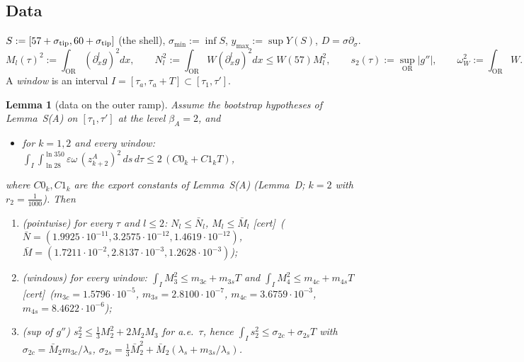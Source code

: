 \documentclass[11pt]{article}
\newtheorem{lemma}{Lemma}\newtheorem{proposition}{Proposition}\newtheorem{remark}{Remark}\newtheorem{definition}{Definition}
\newcommand{\tC}{\textup{[cert]}}\newcommand{\tHd}{\textup{[hand]}}\newcommand{\tE}{\textup{[est]}}\newcommand{\tS}{\textup{[sym]}}
\newcommand{\OR}{\mathrm{OR}}\newcommand{\eI}{\varepsilon_I}
\begin{document}
\subsection{Data}\label{F:sec:data}
$S:=[57+\sigma_{\rm tip},60+\sigma_{\rm tip}]$ (the shell), $\sigma_{\min}:=\inf S$, $y_{\max}:=\sup Y(S)$, $D=\sigma\partial_\sigma$.
\[M_l(\tau)^2:=\int_{\OR}(\partial_x^lg)^2dx,\qquad N_l^2:=\int_{\OR}W(\partial_x^lg)^2dx\le W(57)M_l^2,\qquad s_2(\tau):=\sup_{\OR}|g''|,\qquad\omega_W^2:=\int_{\OR}W .\]
A \emph{window} is an interval $I=[\tau_a,\tau_a+T]\subset[\tau_1,\tau']$.

\begin{lemma}[data on the outer ramp]\label{F:lem:data}
Assume the bootstrap hypotheses of Lemma~S(A) on $[\tau_1,\tau']$ at the level $\beta_A=2$, and
\begin{itemize}[leftmargin=3.2em]
\item[\textup{(B$\Phi$)}] for $k=1,2$ and every window: $\displaystyle\int_I\!\int_{\ln28}^{\ln350}\varepsilon\omega\,(z^A_{k+2})^2\,ds\,d\tau\le2\,(C0_k+C1_kT)$,
\end{itemize}
where $C0_k,C1_k$ are the export constants of Lemma~S(A) (Lemma~D; $k=2$ with $r_2=\frac1{1000}$). Then
\begin{enumerate}[label=(\alph*)]
\item \emph{(pointwise)} for every $\tau$ and $l\le2$: $N_l\le\bar N_l$, $M_l\le\bar M_l$ \tC\ ($\bar N=(1.9925\cdot10^{-11}, 3.2575\cdot10^{-12}, 1.4619\cdot10^{-12})$, $\bar M=(1.7211\cdot10^{-2}, 2.8137\cdot10^{-3}, 1.2628\cdot10^{-3})$);
\item \emph{(windows)} for every window: $\int_IM_3^2\le m_{3c}+m_{3s}T$ and $\int_IM_4^2\le m_{4c}+m_{4s}T$ \tC\ ($m_{3c}=1.5796\cdot10^{-5}$, $m_{3s}=2.8100\cdot10^{-7}$, $m_{4c}=3.6759\cdot10^{-3}$, $m_{4s}=8.4622\cdot10^{-6}$);
\item \emph{(sup of $g''$)} $s_2^2\le\frac13M_2^2+2M_2M_3$ for a.e.\ $\tau$, hence $\int_Is_2^2\le\sigma_{2c}+\sigma_{2s}T$ with $\sigma_{2c}=\bar M_2m_{3c}/\lambda_s$, $\sigma_{2s}=\frac13\bar M_2^2+\bar M_2(\lambda_s+m_{3s}/\lambda_s)$.
\end{enumerate}
\end{lemma}
\end{document}
